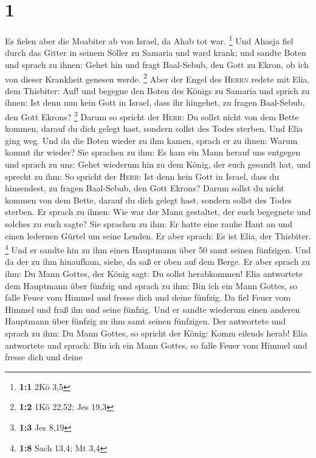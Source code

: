 \hypertarget{section}{%
\section{1}\label{section}}

 Es fielen aber die Moabiter ab von Israel, da Ahab tot
war. \footnote{\textbf{1:1} 2Kö 3,5}  Und Ahasja fiel
durch das Gitter in seinem Söller zu Samaria und ward krank; und sandte
Boten und sprach zu ihnen: Gehet hin und fragt Baal-Sebub, den Gott zu
Ekron, ob ich von dieser Krankheit genesen werde. \footnote{\textbf{1:2}
  1Kö 22,52; Jes 19,3}  Aber der Engel des \textsc{Herrn}
redete mit Elia, dem Thisbiter: Auf! und begegne den Boten des Königs zu
Samaria und sprich zu ihnen: Ist denn nun kein Gott in Israel, dass ihr
hingehet, zu fragen Baal-Sebub, den Gott Ekrons? \footnote{\textbf{1:3}
  Jes 8,19}  Darum so spricht der \textsc{Herr}: Du sollst
nicht von dem Bette kommen, darauf du dich gelegt hast, sondern sollst
des Todes sterben. Und Elia ging weg.  Und da die Boten
wieder zu ihm kamen, sprach er zu ihnen: Warum kommt ihr wieder?
 Sie sprachen zu ihm: Es kam ein Mann herauf uns entgegen
und sprach zu uns: Gehet wiederum hin zu dem König, der euch gesandt
hat, und sprecht zu ihm: So spricht der \textsc{Herr}: Ist denn kein
Gott in Israel, dass du hinsendest, zu fragen Baal-Sebub, den Gott
Ekrons? Darum sollst du nicht kommen von dem Bette, darauf du dich
gelegt hast, sondern sollst des Todes sterben.  Er sprach
zu ihnen: Wie war der Mann gestaltet, der euch begegnete und solches zu
euch sagte?  Sie sprachen zu ihm: Er hatte eine rauhe Haut
an und einen ledernen Gürtel um seine Lenden. Er aber sprach: Es ist
Elia, der Thisbiter. \footnote{\textbf{1:8} Sach 13,4; Mt 3,4}
 Und er sandte hin zu ihm einen Hauptmann über 50 samt
seinen fünfzigen. Und da der zu ihm hinaufkam, siehe, da saß er oben auf
dem Berge. Er aber sprach zu ihm: Du Mann Gottes, der König sagt: Du
sollst herabkommen!  Elia antwortete dem Hauptmann über
fünfzig und sprach zu ihm: Bin ich ein Mann Gottes, so falle Feuer vom
Himmel und fresse dich und deine fünfzig. Da fiel Feuer vom Himmel und
fraß ihn und seine fünfzig.  Und er sandte wiederum einen
anderen Hauptmann über fünfzig zu ihm samt seinen fünfzigen. Der
antwortete und sprach zu ihm: Du Mann Gottes, so spricht der König: Komm
eilends herab!  Elia antwortete und sprach: Bin ich ein
Mann Gottes, so falle Feuer vom Himmel und fresse dich und deine
